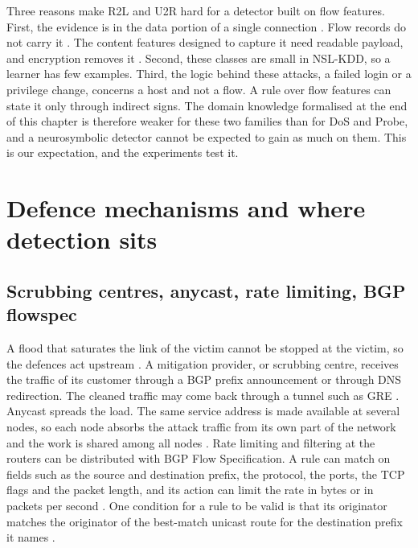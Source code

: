 Three reasons make R2L and U2R hard for a detector built on flow features.
First, the evidence is in the data portion of a single connection
\citep{kddcup1999task,tavallaee2009kddcup99}. Flow records do not carry it
\citep{sperotto2010flowbased}. The content features designed to capture it
need readable payload, and encryption removes it
\citep{tavallaee2009kddcup99,moriarty2018rfc8404}. Second, these classes are
small in NSL-KDD, so a learner has few examples.
Third, the logic behind these attacks, a failed login or a privilege change,
concerns a host and not a flow. A rule over flow features can state it only
through indirect signs. The domain knowledge formalised at the end of this
chapter is therefore weaker for these two families than for DoS and Probe, and a
neurosymbolic detector cannot be expected to gain as much on them. This is
our expectation, and the experiments test it.

\section{Defence mechanisms and where detection sits}
\label{sec:defences}

\subsection{Scrubbing centres, anycast, rate limiting, BGP flowspec}
\label{sec:mitigation-mechanisms}

A flood that saturates the link of the victim cannot be stopped at the
victim, so the defences act upstream \citep{handley2006rfc4732}. A mitigation
provider, or scrubbing centre, receives the traffic of its customer through a
BGP prefix announcement or through DNS redirection. The cleaned traffic may
come back through a tunnel such as GRE \citep{dobbins2021rfc8903}. Anycast
spreads the load. The same service address is made available at several
nodes, so each node absorbs the attack traffic from its own part of the
network and the work is shared among all nodes \citep{abley2006rfc4786}. Rate
limiting and filtering at the routers can be distributed with BGP Flow
Specification. A rule can match on fields such as the source and destination
prefix, the protocol, the ports, the TCP flags and the packet length, and its
action can limit the rate in bytes or in packets per second
\citep{loibl2020rfc8955}. One condition for a rule to be valid is that its
originator matches the originator of the best-match unicast route for the
destination prefix it names \citep{loibl2020rfc8955}.

